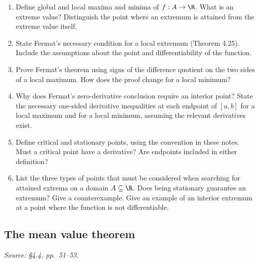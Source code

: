 \begin{enumerate}[resume]
  \item Define global and local maxima and minima of \(f:A\to\R\).
    What is an extreme value? Distinguish the point where an extremum
    is attained from the extreme value itself.

  \item State Fermat's necessary condition for a local extremum
    (Theorem 4.25). Include the assumptions about the point and
    differentiability of the function.

  \item Prove Fermat's theorem using signs of the difference quotient
    on the two sides of a local maximum. How does the proof change
    for a local minimum?

  \item Why does Fermat's zero-derivative conclusion require an
    interior point? State the necessary one-sided derivative
    inequalities at each endpoint of \([a,b]\) for a local maximum
    and for a local minimum, assuming the relevant derivatives exist.

  \item Define critical and stationary points, using the convention
    in these notes. Must a critical point have a derivative?
    Are endpoints included in either definition?

  \item List the three types of points that must be considered when
    searching for attained extrema on a domain \(A\subseteq\R\).
    Does being stationary guarantee an extremum? Give a counterexample.
    Give an example of an interior extremum at a point where the
    function is not differentiable.
\end{enumerate}

\subsection{The mean value theorem}
\textit{Source: \S4.4, pp.~51--53.}

